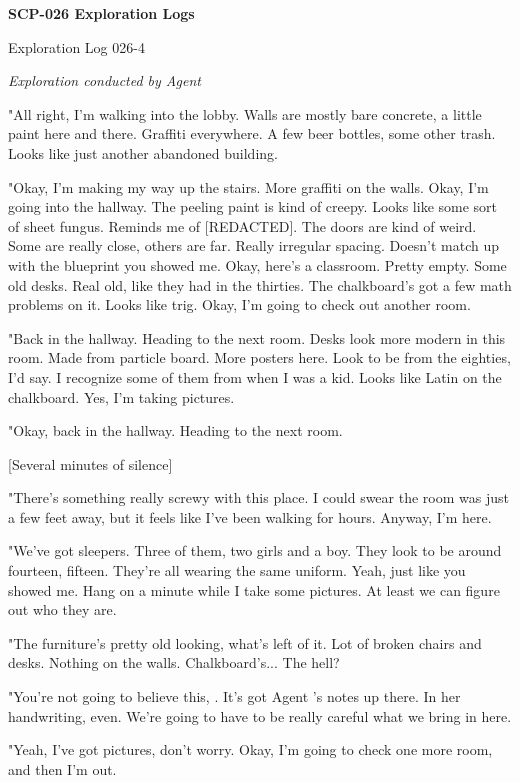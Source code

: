 \textbf{SCP-026 Exploration Logs}
\begin{flushleft}
Exploration Log 026-4
\end{flushleft}
\textsl{Exploration conducted by Agent }

"All right, I'm walking into the lobby. Walls are mostly bare concrete, a little paint here and there. Graffiti everywhere. A few beer bottles, some other trash. Looks like just another abandoned building.

"Okay, I'm making my way up the stairs. More graffiti on the walls. Okay, I'm going into the hallway. The peeling paint is kind of creepy. Looks like some sort of sheet fungus. Reminds me of [REDACTED]. The doors are kind of weird. Some are really close, others are far. Really irregular spacing. Doesn't match up with the blueprint you showed me. Okay, here's a classroom. Pretty empty. Some old desks. Real old, like they had in the thirties. The chalkboard's got a few math problems on it. Looks like trig. Okay, I'm going to check out another room.

"Back in the hallway. Heading to the next room. Desks look more modern in this room. Made from particle board. More posters here. Look to be from the eighties, I'd say. I recognize some of them from when I was a kid. Looks like Latin on the chalkboard. Yes, I'm taking pictures.

"Okay, back in the hallway. Heading to the next room.

[Several minutes of silence]

"There's something really screwy with this place. I could swear the room was just a few feet away, but it feels like I've been walking for hours. Anyway, I'm here.

"We've got sleepers. Three of them, two girls and a boy. They look to be around fourteen, fifteen. They're all wearing the same uniform. Yeah, just like you showed me. Hang on a minute while I take some pictures. At least we can figure out who they are.

"The furniture's pretty old looking, what's left of it. Lot of broken chairs and desks. Nothing on the walls. Chalkboard's... The hell?

"You're not going to believe this, . It's got Agent 's notes up there. In her handwriting, even. We're going to have to be really careful what we bring in here.

"Yeah, I've got pictures, don't worry. Okay, I'm going to check one more room, and then I'm out.

